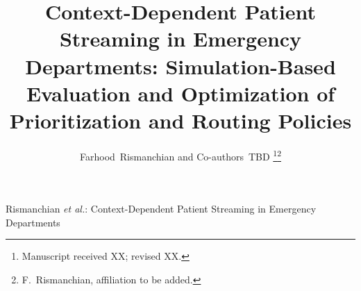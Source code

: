 \documentclass[lettersize,journal]{IEEEtran}
\begin{document}
\title{Context-Dependent Patient Streaming in Emergency Departments: Simulation-Based Evaluation and Optimization of Prioritization and Routing Policies}

\author{Farhood~Rismanchian and Co-authors~TBD%
\thanks{Manuscript received XX; revised XX.}\thanks{F.~Rismanchian, affiliation to be added.}}

%
{Rismanchian \MakeLowercase{\textit{et al.}}: Context-Dependent Patient Streaming in Emergency Departments}

\maketitle





\FloatBarrier
\appendices


\clearpage


\end{document}
